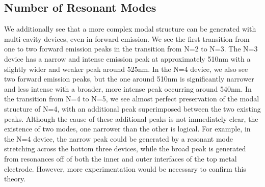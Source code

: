 \documentclass{report}
\begin{document}
        \subsection{Number of Resonant Modes} \label{numModes}
        We additionally see that a more complex modal structure can be generated with multi-cavity devices, even in forward emission. We see the first transition from one to two forward emission peaks in the transition from N=2 to N=3. The N=3 device has a narrow and intense emission peak at approximately 510nm with a slightly wider and weaker peak around 525nm. In the N=4 device, we also see two forward emission peaks, but the one around 510nm is significantly narrower and less intense with a broader, more intense peak occurring around 540nm. In the transition from N=4 to N=5, we see almost perfect preservation of the modal structure of N=4, with an additional peak superimposed between the two existing peaks. Although the cause of these additional peaks is not immediately clear, the existence of two modes, one narrower than the other is logical. For example, in the N=4 device, the narrow peak could be generated by a resonant mode stretching across the bottom three devices, while the broad peak is generated from resonances off of both the inner and outer interfaces of the top metal electrode. However, more experimentation would be necessary to confirm this theory.
\end{document}

